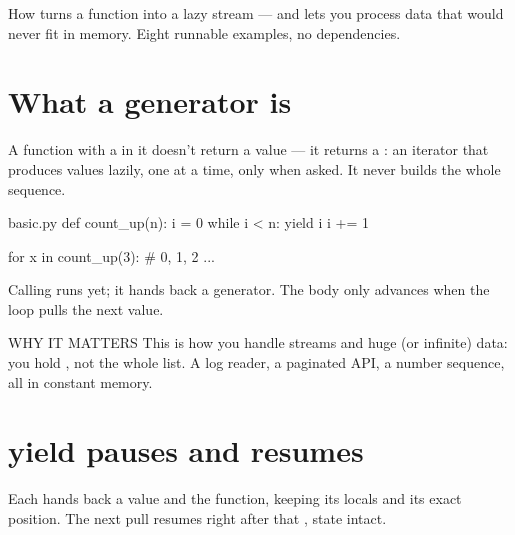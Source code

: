 \def\lnkroot{../}



%
  {How  turns a function into a lazy stream — and lets you process data
   that would never fit in memory. Eight runnable examples, no dependencies.}

\section{What a generator is}

A function with a  in it doesn't return a value — it returns a : an iterator that produces values lazily, one at a time, only when asked. It never builds the whole sequence.

\begin{pycard}{basic.py}
def count_up(n):
    i = 0
    while i < n:
        yield i
        i += 1

for x in count_up(3):   # 0, 1, 2
    ...
\end{pycard}

Calling  runs  yet; it hands back a generator. The body only advances when the  loop pulls the next value.

\begin{callout}{WHY IT MATTERS}
This is how you handle streams and huge (or infinite) data: you hold , not the whole list. A log reader, a paginated API, a number sequence, all in constant memory.
\end{callout}

\section{yield pauses and resumes}

Each  hands back a value and  the function, keeping its locals and its exact position. The next pull resumes right after that , state intact.


